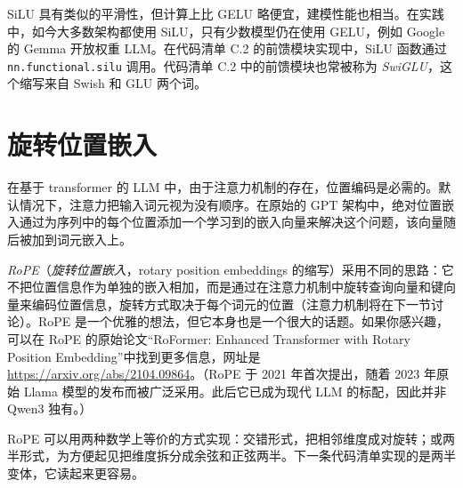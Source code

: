 SiLU 具有类似的平滑性，但计算上比 GELU 略便宜，建模性能也相当。在实践中，如今大多数架构都使用 SiLU，只有少数模型仍在使用 GELU，例如 Google 的 Gemma 开放权重 LLM。在代码清单 C.2 的前馈模块实现中，SiLU 函数通过 \texttt{nn.functional.silu} 调用。代码清单 C.2 中的前馈模块也常被称为 \emph{SwiGLU}，这个缩写来自 Swish 和 GLU 两个词。

\section{旋转位置嵌入}

在基于 transformer 的 LLM 中，由于注意力机制的存在，位置编码是必需的。默认情况下，注意力把输入词元视为没有顺序。在原始的 GPT 架构中，绝对位置嵌入通过为序列中的每个位置添加一个学习到的嵌入向量来解决这个问题，该向量随后被加到词元嵌入上。

\emph{RoPE}（\emph{旋转位置嵌入}，rotary position embeddings 的缩写）采用不同的思路：它不把位置信息作为单独的嵌入相加，而是通过在注意力机制中旋转查询向量和键向量来编码位置信息，旋转方式取决于每个词元的位置（注意力机制将在下一节讨论）。RoPE 是一个优雅的想法，但它本身也是一个很大的话题。如果你感兴趣，可以在 RoPE 的原始论文“RoFormer: Enhanced Transformer with Rotary Position Embedding”中找到更多信息，网址是 \href{https://arxiv.org/abs/2104.09864}{https://arxiv.org/abs/2104.09864}。（RoPE 于 2021 年首次提出，随着 2023 年原始 Llama 模型的发布而被广泛采用。此后它已成为现代 LLM 的标配，因此并非 Qwen3 独有。）

RoPE 可以用两种数学上等价的方式实现：交错形式，把相邻维度成对旋转；或两半形式，为方便起见把维度拆分成余弦和正弦两半。下一条代码清单实现的是两半变体，它读起来更容易。

